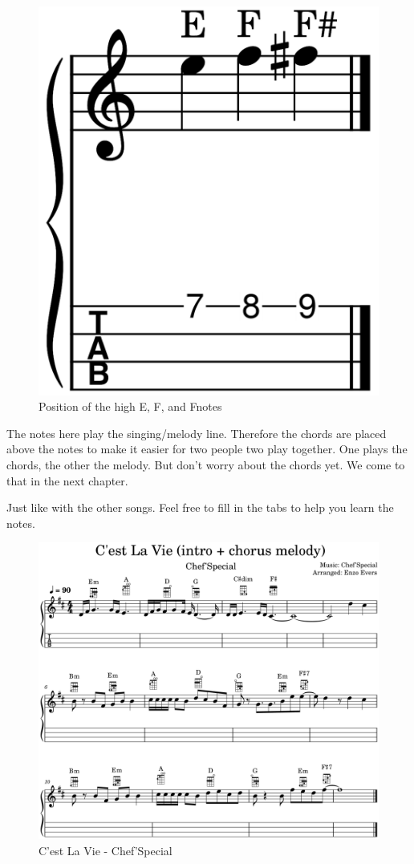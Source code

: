 \begin{figure}[h]
	\centering
	\includegraphics[height=0.12\textheight]{../../MuseScore/Ukulele/UkuleleHighEF.png}
	\caption{Position of the high E, F, and F\sharp notes}
	\label{fig:ukulele_high_e_f_notes}
\end{figure}

The notes here play the singing/melody line. Therefore the chords are placed above the notes to make it easier for two people two play together. One plays the chords, the other the melody. But don't worry about the chords yet. We come to that in the next chapter.

Just like with the other songs. Feel free to fill in the tabs to help you learn the notes.

\begin{figure}[h]
	\centering
	\includegraphics[width=\textwidth]{../../MuseScore/Ukulele/UkuleleCestLaVieChefSpecial_IntroChorus.png}
	\caption{C'est La Vie - Chef'Special}
	\label{fig:ukulele_cest_la_vie_chefspecial}
\end{figure}
